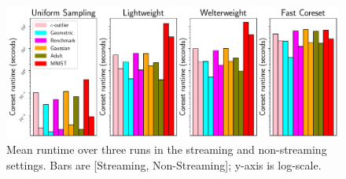 \begin{figure}
    \centering
    \includegraphics[width=.95\linewidth]{images/2/coreset_runtime-composition.pdf}
    \caption{Mean runtime over three runs in the streaming and non-streaming settings. Bars are [Streaming, Non-Streaming]; y-axis is log-scale.}
    \label{fig:coreset_size_on_sens_quality}
\end{figure}
